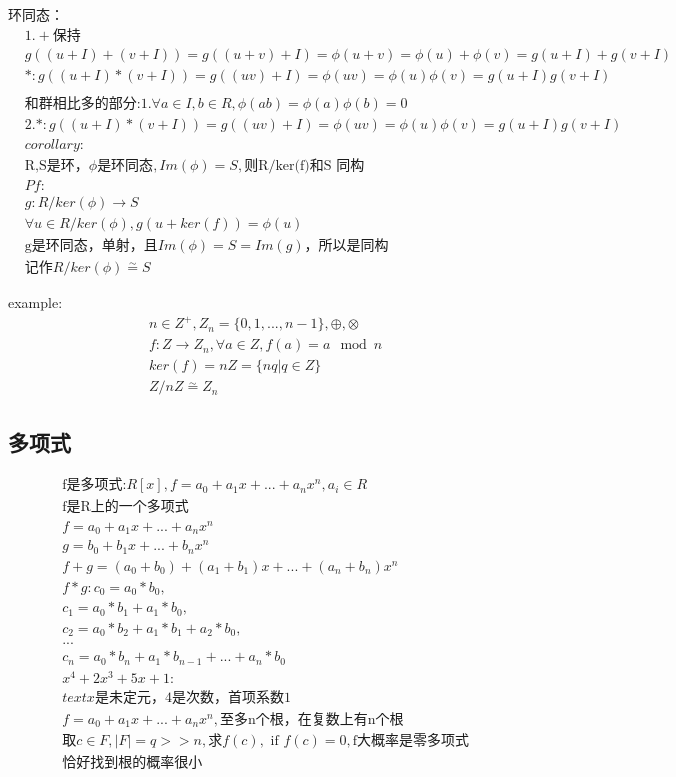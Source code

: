 \documentclass[12pt, a4paper]{article}  %
\begin{document}
环同态：
\begin{align}
    &1.+\text{保持}\\
    &g((u+I)+(v+I))=g((u+v)+I)=\phi(u+v)=\phi(u)+\phi(v)=g(u+I)+g(v+I)\\
    &*: g((u+I)*(v+I))=g((uv)+I)=\phi(uv)=\phi(u)\phi(v)=g(u+I)g(v+I)\\
    & \\
    &\text{和群相比多的部分:} 1.\forall a\in I,b\in R,\phi(ab)=\phi(a) \phi(b)=0\\
    &2.*: g((u+I)*(v+I))=g((uv)+I)=\phi(uv)=\phi(u)\phi(v)=g(u+I)g(v+I)\\
    &corollary:\\
    &\text{R,S是环，}\phi\text{是环同态},Im(\phi)=S,\text{则R/ker(f)和S 同构}\\
    &Pf:\\
    &g:R/ker(\phi)\rightarrow S\\
    &\forall u\in R/ker(\phi),g(u+ker(f))=\phi(u)\\
    &\text{g是环同态，单射，且}Im(\phi)=S=Im(g)\text{，所以是同构}\\
    &\text{记作}R/ker(\phi) \overset{\sim}{=} S
\end{align}

example:
\begin{align}
    &n\in Z^{+},Z_n=\{0,1,...,n-1\},\oplus,\otimes\\
    &f:Z\rightarrow Z_n,\forall a\in Z,f(a)=a\mod n\\
    &ker(f)=nZ=\{nq|q\in Z\}\\
    &Z/nZ \overset{\sim}{=} Z_n
\end{align}

\subsection{多项式}
\begin{align}
    &\text{f是多项式:}R[x],f=a_0+a_1x+...+a_nx^n,a_i\in R\\
    &\text{f是R上的一个多项式}\\
    &f=a_0+a_1x+...+a_nx^n\\
    &g=b_0+b_1x+...+b_nx^n\\
    &f+g=(a_0+b_0)+(a_1+b_1)x+...+(a_n+b_n)x^n\\
    &f*g:c_0=a_0*b_0,\\
    &c_1=a_0*b_1+a_1*b_0,\\
    &c_2=a_0*b_2+a_1*b_1+a_2*b_0,\\
    &...\\
    &c_n=a_0*b_n+a_1*b_{n-1}+...+a_n*b_0\\
    &x^4+2x^3+5x+1:\\
    & text{x是未定元，4是次数，首项系数1}\\
    &f=a_0+a_1x+...+a_nx^n,\text{至多n个根，在复数上有n个根}\\
    &\text{取}c\in F,|F|=q>>n,\text{求}f(c),\text{ if }f(c)=0,\text{f大概率是零多项式}\\
    &\text{恰好找到根的概率很小}
\end{align}
\end{document}
